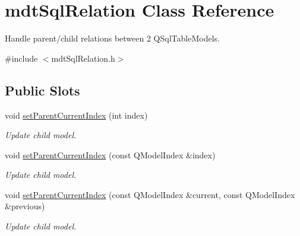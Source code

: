 \hypertarget{classmdt_sql_relation}{
\section{mdtSqlRelation Class Reference}
\label{classmdt_sql_relation}
}


Handle parent/child relations between 2 QSqlTableModels.  




{\ttfamily \#include $<$mdtSqlRelation.h$>$}

\subsection*{Public Slots}
\begin{DoxyCompactItemize}
\item 
void \hyperlink{classmdt_sql_relation_a39fbecb027a5783277df1cc995485917}{setParentCurrentIndex} (int index)
\begin{DoxyCompactList}\small\item\em Update child model. \end{DoxyCompactList}\item 
void \hyperlink{classmdt_sql_relation_a4381f7f5bd39337fa5cbccf9b87ff0f6}{setParentCurrentIndex} (const QModelIndex \&index)
\begin{DoxyCompactList}\small\item\em Update child model. \end{DoxyCompactList}\item 
void \hyperlink{classmdt_sql_relation_a82a90b12bb78a4b0f9751244f134889d}{setParentCurrentIndex} (const QModelIndex \&current, const QModelIndex \&previous)
\begin{DoxyCompactList}\small\item\em Update child model. \end{DoxyCompactList}\end{DoxyCompactItemize}
